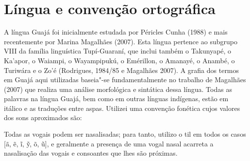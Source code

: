 
\chapter{Língua e convenção
ortográfica}\label{luxedngua-e-convenuxe7uxe3o-ortogruxe1fica}


\noindent A língua Guajá foi inicialmente estudada por Péricles Cunha (1988) e
mais recentemente por Marina Magalhães (2007). Esta língua pertence ao
subgrupo VIII da família linguística Tupí-Guaraní, que inclui também o
Takunyapé, o Ka'apor, o Waiampi, o Wayampipukú, o Emérillon, o Amanayé,
o Anambé, o Turiwára e o Zo'é (Rodrigues, 1984/85 e Magalhães 2007). A
grafia dos termos em Guajá aqui utilizadas baseia"-se fundamentalmente no
trabalho de Magalhães (2007) que realiza uma análise morfológica e
sintática dessa língua. Todas as palavras na língua Guajá, bem como em
outras línguas indígenas, estão em itálico e as traduções entre aspas.
Utilizei uma convenção fonética cujos valores dos sons aproximados são:



Todas as vogais podem ser nasalisadas; para tanto, utilizo o til em
todos os casos {[}ã, ẽ, ĩ, ỹ, õ, ũ{]}, e geralmente a presença de uma
vogal nasal acarreta a nasalisação das vogais e consoantes que lhes são
próximas.


